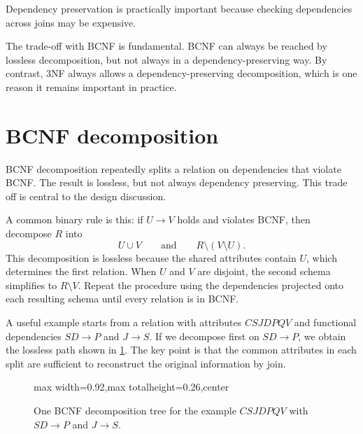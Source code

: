 \documentclass[11pt,a4paper,openany]{book}
\begin{document}
Dependency preservation is practically important because checking dependencies across joins may be expensive.

The trade-off with BCNF is fundamental. BCNF can always be reached by lossless decomposition, but not always in a dependency-preserving way. By contrast, 3NF always allows a dependency-preserving decomposition, which is one reason it remains important in practice.

\section{BCNF decomposition}
BCNF decomposition repeatedly splits a relation on dependencies that violate BCNF. The result is lossless, but not always dependency preserving. This trade off is central to the design discussion.

A common binary rule is this: if \(U\to V\) holds and violates BCNF, then decompose \(R\) into
\[
U\cup V \qquad\text{and}\qquad R\setminus(V\setminus U).
\]
This decomposition is lossless because the shared attributes contain \(U\), which determines the first relation. When \(U\) and \(V\) are disjoint, the second schema simplifies to \(R\setminus V\). Repeat the procedure using the dependencies projected onto each resulting schema until every relation is in BCNF.

A useful example starts from a relation with attributes \(CSJDPQV\) and functional dependencies \(SD \to P\) and \(J \to S\). If we decompose first on \(SD \to P\), we obtain the lossless path shown in \cref{fig:bcnf-tree}. The key point is that the common attributes in each split are sufficient to reconstruct the original information by join.

\begin{figure}[tbp]
\centering
\begin{adjustbox}{max width=0.92\linewidth,max totalheight=0.26\textheight,center}
\end{adjustbox}
\caption{One BCNF decomposition tree for the example \(CSJDPQV\) with \(SD\to P\) and \(J\to S\).}
\label{fig:bcnf-tree}
\end{figure}
\end{document}
